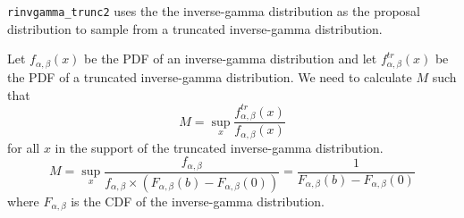 \begin{answerenum}
    \item \texttt{rinvgamma\_trunc2} uses the the inverse-gamma distribution as the proposal distribution to sample from a truncated inverse-gamma distribution.

    Let \(f_{\alpha, \beta}(x)\) be the PDF of an inverse-gamma distribution and let \(f_{\alpha, \beta}^{tr}(x)\) be the PDF of a truncated inverse-gamma distribution.
    We need to calculate \(M\) such that
    \[ M = \sup_{x} \frac{f_{\alpha, \beta}^{tr}(x)}{f_{\alpha, \beta}(x)}\]
    for all \(x\) in the support of the truncated inverse-gamma distribution.
    \[ M = \sup_x \frac{f_{\alpha, \beta}}{f_{\alpha, \beta} \times (F_{\alpha, \beta}(b) - F_{\alpha, \beta}(0))} = \frac{1}{F_{\alpha, \beta}(b) - F_{\alpha, \beta}(0)} \]
    where \(F_{\alpha, \beta}\) is the CDF of the inverse-gamma distribution.


\end{answerenum}
